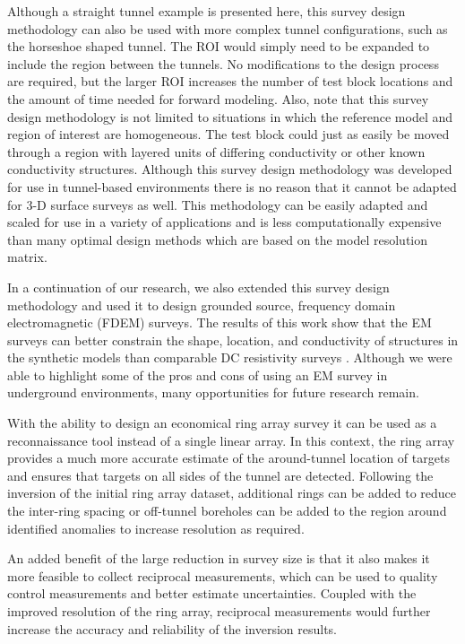 \documentclass[preprint,authoryear,12pt]{elsarticle}
\begin{document}
Although a straight tunnel example is presented here, this survey design methodology can also be used with more complex tunnel configurations, such as the horseshoe shaped tunnel. The ROI would simply need to be expanded to include the region between the tunnels. No modifications to the design process are required, but the larger ROI increases the number of test block locations and the amount of time needed for forward modeling. Also, note that this survey design methodology is not limited to situations in which the reference model and region of interest are homogeneous. The test block could just as easily be moved through a region with layered units of differing conductivity or other known conductivity structures. Although this survey design methodology was developed for use in tunnel-based environments there is no reason that it cannot be adapted for 3-D surface surveys as well. This methodology can be easily adapted and scaled for use in a variety of applications and is less computationally expensive than many optimal design methods which are based on the model resolution matrix.

In a continuation of our research, we also extended this survey design methodology and used it to design grounded source, frequency domain electromagnetic (FDEM) surveys. The results of this work show that the EM surveys can better constrain the shape, location, and conductivity of structures in the synthetic models than comparable DC resistivity surveys \citep{Mitchell2020}. Although we were able to highlight some of the pros and cons of using an EM survey in underground environments, many opportunities for future research remain.

With the ability to design an economical ring array survey it can be used as a reconnaissance tool instead of a single linear array. In this context, the ring array provides a much more accurate estimate of the around-tunnel location of targets and ensures that targets on all sides of the tunnel are detected. Following the inversion of the initial ring array dataset, additional rings can be added to reduce the inter-ring spacing or off-tunnel boreholes can be added to the region around identified anomalies to increase resolution as required.

An added benefit of the large reduction in survey size is that it also makes it more feasible to collect reciprocal measurements, which can be used to quality control measurements and better estimate uncertainties. Coupled with the improved resolution of the ring array, reciprocal measurements would further increase the accuracy and reliability of the inversion results.
\end{document}

